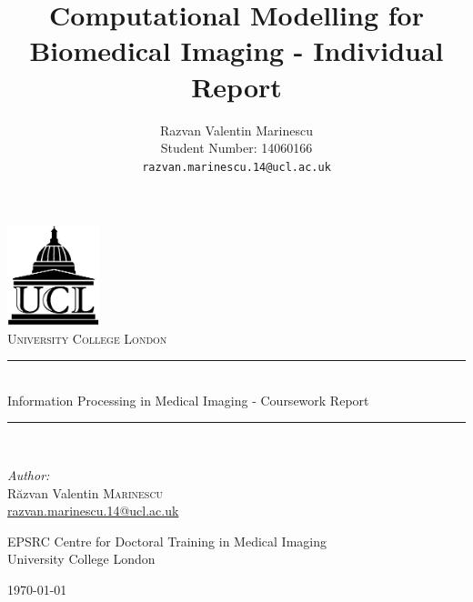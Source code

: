 \documentclass[11pt,a4paper,oneside]{report}
\title{Computational Modelling for Biomedical Imaging - Individual Report}
\author{
Razvan Valentin Marinescu\\
Student Number: 14060166\\
\texttt{razvan.marinescu.14@ucl.ac.uk}
}
\begin{document}

\begin{titlepage}
\begin{center}

\includegraphics[width=0.2\textwidth]{ucl-logo2}~\\[1cm]

\textsc{\LARGE University College London}\\[1.5cm]

\newcommand{\HRule}{\rule{\linewidth}{0.5mm}}

\HRule \\[0.4cm]
{ \Large Information Processing in Medical Imaging - Coursework Report \\[0.4cm] }

\HRule \\[1.5cm]

\begin{minipage}{0.4\textwidth}
\centering
\emph{Author:}\\
R\u{a}zvan Valentin \textsc{Marinescu}\\
\href{razvan.marinescu.14@ucl.ac.uk}{razvan.marinescu.14@ucl.ac.uk}\\
\end{minipage}


\vfill

\vfill
\vfill

EPSRC Centre for Doctoral Training in Medical Imaging\\ University College London

\vfill

{\large \today}

\end{center}
\end{titlepage}


\end{document}
